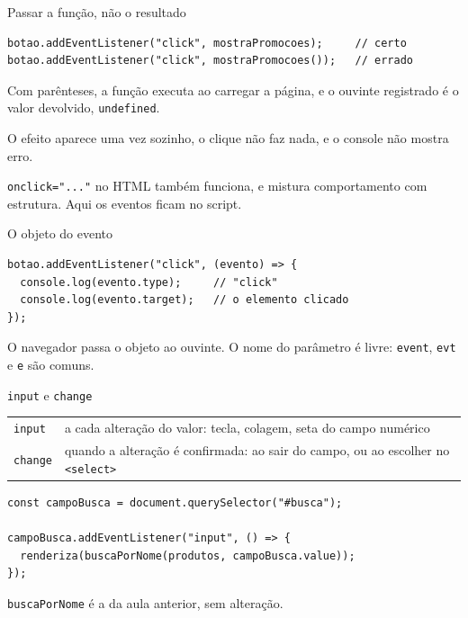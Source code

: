 \documentclass{beamer}
\begin{document}
\begin{frame}[fragile]{Passar a função, não o resultado}
	\begin{verbatim}
botao.addEventListener("click", mostraPromocoes);     // certo
botao.addEventListener("click", mostraPromocoes());   // errado
	\end{verbatim}

	\vspace{0.3cm}
	Com parênteses, a função executa ao carregar a página, e o ouvinte
	registrado é o valor devolvido, \texttt{undefined}.

	\vspace{0.3cm}
	O efeito aparece uma vez sozinho, o clique não faz nada, e o console não
	mostra erro.

	\vspace{0.3cm}
	\texttt{onclick="..."} no HTML também funciona, e mistura comportamento com
	estrutura. Aqui os eventos ficam no script.
\end{frame}

\begin{frame}[fragile]{O objeto do evento}
	\begin{verbatim}
botao.addEventListener("click", (evento) => {
  console.log(evento.type);     // "click"
  console.log(evento.target);   // o elemento clicado
});
	\end{verbatim}

	\vspace{0.3cm}
	O navegador passa o objeto ao ouvinte. O nome do parâmetro é livre:
	\texttt{event}, \texttt{evt} e \texttt{e} são comuns.
\end{frame}

\begin{frame}[fragile]{\texttt{input} e \texttt{change}}
	\begin{tabular}{l>{\raggedright\arraybackslash}p{}}
		\toprule
		\texttt{input}  & a cada alteração do valor: tecla, colagem, seta do
		campo numérico \\
		\texttt{change} & quando a alteração é confirmada: ao sair do campo, ou
		ao escolher no \texttt{<select>} \\
		\bottomrule
	\end{tabular}

	\begin{verbatim}
const campoBusca = document.querySelector("#busca");

campoBusca.addEventListener("input", () => {
  renderiza(buscaPorNome(produtos, campoBusca.value));
});
	\end{verbatim}

	\texttt{buscaPorNome} é a da aula anterior, sem alteração.
\end{frame}
\end{document}
